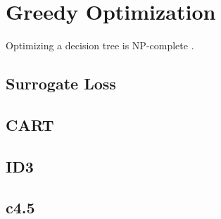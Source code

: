 \section{Greedy Optimization} 

Optimizing a decision tree is NP-complete \cite{1976hyafil}. 

\subsection{Surrogate Loss}

\subsection{CART} 

\subsection{ID3} 

\subsection{c4.5} 

